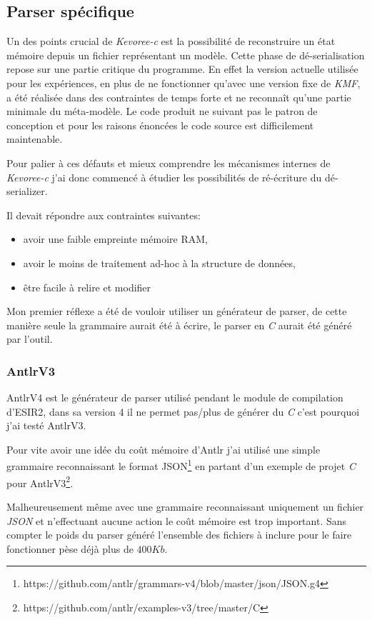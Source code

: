 \subsection{\label{parser-spécif}Parser spécifique}

Un des points crucial de \emph{Kevoree-c} est la possibilité de reconstruire un état mémoire depuis un fichier représentant un modèle. Cette phase de dé-serialisation repose sur une partie critique du programme. En effet la version actuelle utilisée pour les expériences, en plus de ne fonctionner qu'avec une version fixe de \emph{KMF}, a été réalisée dans des contraintes de temps forte et ne reconnaît qu'une partie minimale du méta-modèle.
Le code produit ne suivant pas le patron de conception et pour les raisons énoncées le code source est difficilement maintenable.

Pour palier à ces défauts et mieux comprendre les mécanismes internes de \emph{Kevoree-c} j'ai donc commencé à étudier les possibilités de ré-écriture du dé-serializer.

Il devait répondre aux contraintes suivantes:

\begin{itemize}
\item avoir une faible empreinte mémoire RAM,
\item avoir le moins de traitement ad-hoc à la structure de données,
\item être facile à relire et modifier
\end{itemize}

Mon premier réflexe a été de vouloir utiliser un générateur de parser, de cette manière seule la grammaire aurait été à écrire, le parser en \emph{C} aurait été généré par l'outil.

\subsubsection{AntlrV3}
AntlrV4 est le générateur de parser utilisé pendant le module de compilation d'ESIR2, dans sa version 4 il ne permet pas/plus de générer du \emph{C} c'est pourquoi j'ai testé AntlrV3.

Pour vite avoir une idée du coût mémoire d'Antlr j'ai utilisé une simple grammaire reconnaissant le format JSON\footnote{https://github.com/antlr/grammars-v4/blob/master/json/JSON.g4} en partant d'un exemple de projet \emph{C} pour AntlrV3\footnote{https://github.com/antlr/examples-v3/tree/master/C}.

Malheureusement même avec une grammaire reconnaissant uniquement un fichier \emph{JSON} et n'effectuant aucune action le coût mémoire est trop important. Sans compter le poids du parser généré l'ensemble des fichiers à inclure pour le faire fonctionner pèse déjà plus de $400Kb$.

